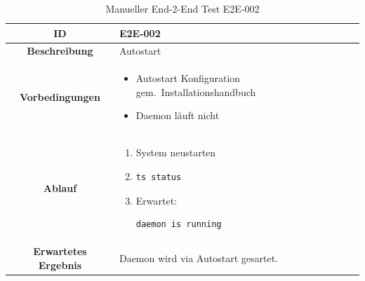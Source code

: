 \documentclass[a4paper,12pt]{report}
\begin{document}
    \begin{table}[h!]
        \centering
        \setlength{\leftmargini}{0.8cm}
        \begin{tabular}{|c|p{10cm}|}
            \hline
            \textbf{ID}           & E2E-002                                                                 \\ \hline
            \textbf{Beschreibung} & Autostart         \\ \hline
            \textbf{Vorbedingungen} &
            \begin{itemize}
                \item Autostart Konfiguration gem.\ Installationshandbuch
                \item Daemon läuft nicht
            \end{itemize} \\ \hline
            \textbf{Ablauf} &
            \begin{enumerate}
                \item System neustarten
                \item \begin{verbatim}ts status\end{verbatim}
                \item Erwartet: \begin{verbatim}daemon is running\end{verbatim}
            \end{enumerate} \\ \hline
            \textbf{Erwartetes Ergebnis} & Daemon wird via Autostart gesartet. \\ \hline
        \end{tabular}
        \caption{Manueller End-2-End Test E2E-002}\label{tab:e2e-2}
    \end{table}
\end{document}
